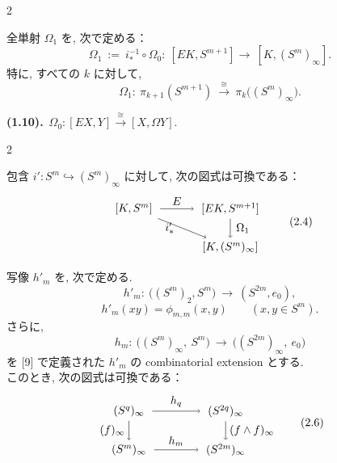 \documentclass[10pt, leqno]{ltjsarticle} %
\newcommand{\into}{\hookrightarrow}
\numberwithin{equation}{section}
\theoremstyle{plain}
\theoremstyle{definition}
\theoremstyle{remark}
\begin{document}
\begin{paracol}{2}

全単射 $\Omega_1$ を, 次で定める：
\begin{equation}\label{eq:2.3}
\Omega_1\ :=\ i_*^{-1}\circ \Omega_0:\ 
[EK, S^{m+1}] \xrightarrow{}\ 
[K, (S^m)_\infty].
\tag{2.3}
\end{equation}
特に, すべての $k$ に対して,
\[
\Omega_1:\ \pi_{k+1}(S^{m+1})\ 
\xrightarrow{\cong}\ \pi_k\bigl((S^m)_\infty\bigr).
\]

\switchcolumn

\noindent
\textbf{(1.10).}\
\(\Omega_0: [EX, Y]\xrightarrow{\cong} [X, \Omega Y].\)
  
\end{paracol}

\begin{paracol}{2}


包含 $i':S^m\into(S^m)_\infty$ に対して, 次の図式は可換である：
\begin{equation}\label{eq:2.4}
\begin{tikzpicture}[baseline=(current bounding box.center)]
  \node (A) at (0,1.2) {$\ [K, S^m]\ $};
  \node (B) at (3,1.2) {$\ [EK, S^{m+1}]\ $};
  \node (C) at (3,0)   {$\ [K, (S^m)_\infty]\ $};
  \draw[->] (A) -- node[above] {$E$} (B);
  \draw[->] (A) -- node[left] {$i'_*\,\,$} (C);
  \draw[->] (B) -- node[right] {$\,\Omega_1$} (C);
\end{tikzpicture}
\tag{2.4}
\end{equation}

写像 \(h'_m\) を, 次で定める.
\[
h'_m:\ \bigl((S^m)_2, S^m\bigr)\ \to\ (S^{2m},e_0),
\]
\[
h'_m(xy)=\phi_{m,m}(x,y)\qquad(x,y\in S^m).
\]
さらに,
\begin{equation}\label{eq:2.5}
h_m:\ \bigl((S^m)_\infty,\ S^m\bigr)\ \longrightarrow\
\bigl((S^{2m})_\infty,\ e_0\bigr)
\tag{2.5}
\end{equation}
を [9] で定義された \(h'_m\) の combinatorial extension とする. \\
このとき, 次の図式は可換である：
\begin{equation}\label{eq:2.6}
\begin{tikzpicture}[baseline=(current bounding box.center)]
  \node (A) at (0,1.2) {$\ (S^q)_\infty\ $};
  \node (B) at (3,1.2) {$\ (S^{2q})_\infty\ $};
  \node (C) at (0,0)   {$\ (S^m)_\infty\ $};
  \node (D) at (3,0)   {$\ (S^{2m})_\infty\ $};
  \draw[->] (A) -- node[above] {$h_q$} (B);
  \draw[->] (C) -- node[above] {$h_m$} (D);
  \draw[->] (A) -- node[left] {$(f)_\infty$} (C);
  \draw[->] (B) -- node[right] {$(f\wedge f)_\infty$} (D);
\end{tikzpicture}
\tag{2.6}
\end{equation}


\end{paracol}
\end{document}
